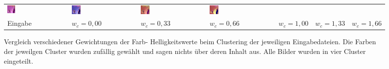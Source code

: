 \begin{figure}[h!]
\begin{tabular}{C{0.14\textwidth}C{0.14\textwidth}C{0.14\textwidth}C{0.14\textwidth}C{0.14\textwidth}C{0.14\textwidth}C{0.14\textwidth}}
		\includegraphics[width=0.14\textwidth]{images/gen/color_weight/p03_04.png_0.66.png} &
		\includegraphics[width=0.14\textwidth]{images/gen/color_weight/p03_04.png_1.00.png} &
		\includegraphics[width=0.14\textwidth]{images/gen/color_weight/p03_04.png_1.33.png} &
		\includegraphics[width=0.14\textwidth]{images/gen/color_weight/p03_04.png_1.66.png} \\
		
		\hspace{2pt}\newline\centering Eingabe & 
		\hspace{2pt}\newline\centering $w_c=0,00$ &
		\hspace{2pt}\newline\centering $w_c=0,33$ &
		\hspace{2pt}\newline\centering $w_c=0,66$ &
		\hspace{2pt}\newline\centering $w_c=1,00$ &
		\hspace{2pt}\newline\centering $w_c=1,33$ &
		\hspace{2pt}\newline\centering $w_c=1,66$
	\end{tabular}
	\caption{Vergleich verschiedener Gewichtungen der Farb- \bzw Helligkeitswerte beim Clustering der jeweiligen Eingabedateien. Die Farben der jeweilgen Cluster wurden zufällig gewählt und sagen nichts über deren Inhalt aus. Alle Bilder wurden in vier Cluster eingeteilt.}
	\label{fig:filterbank_weights_col}
\end{figure}

